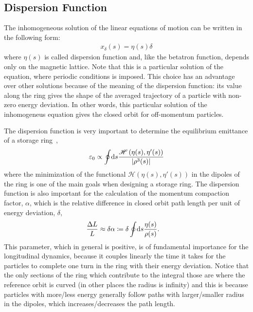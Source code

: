 \subsection{Dispersion Function}

	The inhomogeneous solution of the linear equations of motion can be written in the following form:
	\begin{align}\label{eq:dispersion_function}
		x_\delta(s) = \eta(s)\delta
	\end{align}
	where $\eta(s)$ is called dispersion function and, like the betatron function, depends only on the magnetic lattice. Note that this is a particular solution of the equation, where periodic conditions is imposed. This choice has an advantage over other solutions because of the meaning of the dispersion function: its value along the ring gives the shape of the averaged trajectory of a particle with non-zero energy deviation. In other words, this particular solution of the inhomogeneus equation gives the closed orbit for off-momentum particles.

	The dispersion function is very important to determine the equilibrium emittance of a storage ring~\cite[pp. 304]{Wiedemann2007},
    \begin{align}
        \varepsilon_0 \propto \oint\!\text{d}s \frac
                        {\mathscr{H}\left(\eta(s),\eta'(s)\right)}
                        {\left|\rho^3(s)\right|}
    \end{align}
     where the minimization of the functional $\mathscr{H}(\eta(s), \eta'(s))$ in the dipoles of the ring is one of the main goals when designing a storage ring. The dispersion function is also important for the calculation of the momentum compaction factor, $\alpha$, which is the relative difference in closed orbit path length per unit of energy deviation, $\delta$,
	\begin{align}\label{eq:momentum_compaction}
		\frac{\Delta L}{L} &\approx \delta \alpha \coloneqq \delta \oint\!\text{d}s \frac{\eta(s)}{\rho(s)}.
	\end{align}
	This parameter, which in general is positive, is of fundamental importance for the longitudinal dynamics, because it couples linearly the time it takes for the particles to complete one turn in the ring with their energy deviation. Notice that the only sections of the ring which contribute to the integral those are where the reference orbit is curved (in other places the radius is infinity) and this is because particles with more/less energy generally follow paths with larger/smaller radius in the dipoles, which increases/decreases the path length.

